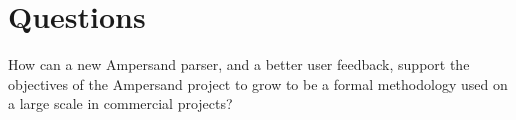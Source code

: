 
\section{Questions}
\label{sec:questions}

\begin{description}
  \item [How can a new Ampersand parser, and a better user feedback, support the objectives of the Ampersand project to grow to be a formal methodology used on a large scale in commercial projects?]
\end{description}
